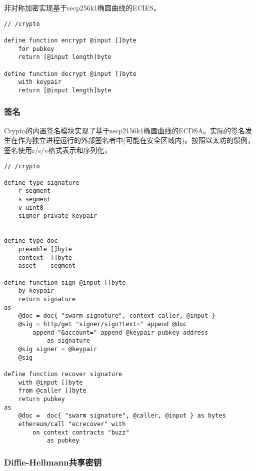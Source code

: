 非对称加密实现基于secp256k1椭圆曲线的ECIES。 

\begin{definition}\label{def:asymmetric-encryption}
\begin{lstlisting}[language=buzz1]
// /crypto

define function encrypt @input []byte 
    for pubkey
    return [@input length]byte

define function decrypt @input []byte 
    with keypair
    return [@input length]byte

\end{lstlisting}
\end{definition}  


\subsubsection{签名}

Crypto的内置签名模块实现了基于secp2156k1椭圆曲线的ECDSA。实际的签名发生在作为独立进程运行的外部签名者中(可能在安全区域内)。按照以太坊的惯例，签名使用r/s/v格式表示和序列化，

\begin{definition}[Signature]\label{def:signature}
\begin{lstlisting}[language=buzz1]
// /crypto

define type signature
    r segment
    s segment
    v uint8
    signer private keypair
    

define type doc 
    preamble []byte
    context  []byte
    asset    segment
    
define function sign @input []byte 
    by keypair
    return signature
as
    @doc = doc{ "swarm signature", context caller, @input }
    @sig = http/get "signer/sign?text=" append @doc 
        append "&account=" append @keypair pubkey address
            as signature 
    @sig signer = @keypair
    @sig
    
define function recover signature
    with @input []byte
    from @caller []byte
    return pubkey
as
    @doc =  doc{ "swarm signature", @caller, @input } as bytes
    ethereum/call "ecrecover" with 
        on context contracts "buzz" 
            as pubkey

\end{lstlisting}
\end{definition}  


\subsubsection{Diffie-Hellmann共享密钥}

